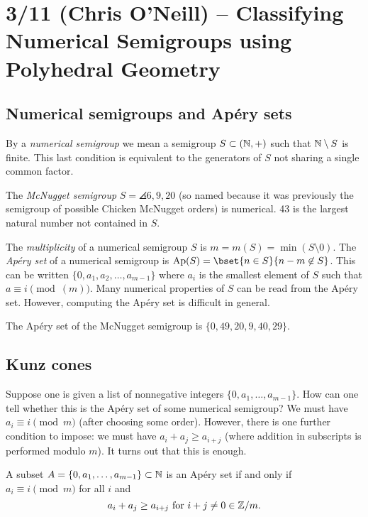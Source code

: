 \documentclass{article}
\begin{document}
\section{3/11 (Chris O'Neill) -- Classifying Numerical Semigroups using Polyhedral Geometry}

\subsection{Numerical semigroups and Ap\'ery sets}

By a \emph{numerical semigroup} we mean a semigroup $S \subset (\mathbb{N}, +)$ such that $\mathbb{N} \setminus S$ is finite.
This last condition is equivalent to the generators of $S$ not sharing a single common factor.

\begin{ex}
	The \emph{McNugget semigroup} $S = \angles{6, 9, 20}$ (so named because it was previously the semigroup of possible Chicken McNugget orders) is numerical.
	43 is the largest natural number not contained in $S$.
\end{ex}

The \emph{multiplicity} of a numerical semigroup $S$ is $m = m(S) = \min(S \setminus 0)$.
The \emph{Ap\'ery set} of a numerical semigroup is $\operatorname{Ap}(S) = \bset{n \in S}{n - m \not\in S}$.
This can be written $\{ 0, a_1, a_2, \dots, a_{m - 1}\}$ where $a_i$ is the smallest element of $S$ such that $a \equiv i \pmod(m)$.
Many numerical properties of $S$ can be read from the Ap\'ery set.
However, computing the Ap\'ery set is difficult in general.

\begin{ex}
	The Ap\'ery set of the McNugget semigroup is $\{ 0, 49, 20, 9, 40, 29 \}$.
\end{ex}

\subsection{Kunz cones}

Suppose one is given a list of nonnegative integers $\{ 0, a_1, \dots, a_{m-1} \}$.
How can one tell whether this is the Ap\'ery set of some numerical semigroup?
We must have $a_i \equiv i \pmod m$ (after choosing some order).
However, there is one further condition to impose: we must have $a_i + a_j \geq a_{i + j}$ (where addition in subscripts is performed modulo $m$).
It turns out that this is enough.

\begin{thm}[Kunz]
	A subset $A = \{ 0, a_1, \dots, a_{m-1} \} \subset \mathbb{N}$ is an Ap\'ery set if and only if $a_i \equiv i \pmod m$ for all $i$ and 
	\[
		a_i + a_j \geq a_{i+j} \textrm{ for } i + j \neq 0 \in \mathbb{Z}/m.
	\]
\end{thm}
\end{document}
